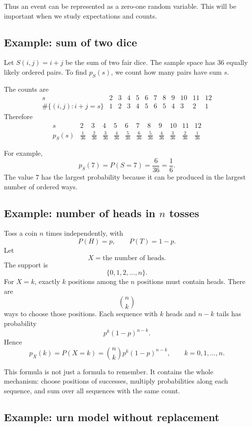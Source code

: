 Thus an event can be represented as a zero-one random variable. This will be
important when we study expectations and counts.

\subsection*{Example: sum of two dice}

Let \(S(i,j)=i+j\) be the sum of two fair dice. The sample space has \(36\)
equally likely ordered pairs. To find \(p_S(s)\), we count how many pairs have
sum \(s\).

The counts are
\[
\begin{array}{c|ccccccccccc}
s&2&3&4&5&6&7&8&9&10&11&12\\
\hline
\#\{(i,j):i+j=s\}&1&2&3&4&5&6&5&4&3&2&1
\end{array}
\]
Therefore
\[
\begin{array}{c|ccccccccccc}
s&2&3&4&5&6&7&8&9&10&11&12\\
\hline
p_S(s)&\frac1{36}&\frac2{36}&\frac3{36}&\frac4{36}&\frac5{36}&\frac6{36}&\frac5{36}&\frac4{36}&\frac3{36}&\frac2{36}&\frac1{36}
\end{array}
\]

For example,
\[
p_S(7)=P(S=7)=\frac6{36}=\frac16.
\]
The value \(7\) has the largest probability because it can be produced in the
largest number of ordered ways.

\subsection*{Example: number of heads in \(n\) tosses}

Toss a coin \(n\) times independently, with
\[
P(H)=p,\qquad P(T)=1-p.
\]
Let
\[
X=\text{the number of heads}.
\]
The support is
\[
\{0,1,2,\ldots,n\}.
\]
For \(X=k\), exactly \(k\) positions among the \(n\) positions must contain heads.
There are
\[
\binom{n}{k}
\]
ways to choose those positions. Each sequence with \(k\) heads and \(n-k\) tails
has probability
\[
p^k(1-p)^{n-k}.
\]
Hence
\[
p_X(k)=P(X=k)=\binom{n}{k}p^k(1-p)^{n-k},\qquad k=0,1,\ldots,n.
\]

This formula is not just a formula to remember. It contains the whole mechanism:
choose positions of successes, multiply probabilities along each sequence, and
sum over all sequences with the same count.

\subsection*{Example: urn model without replacement}

